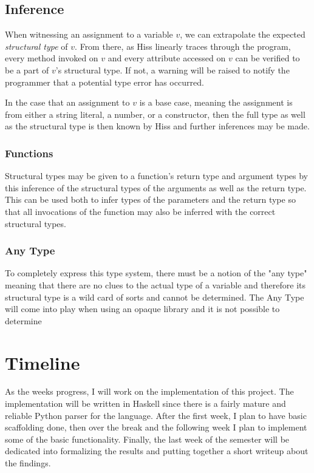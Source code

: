 \documentclass{scrartcl}
\begin{document}
\begin{multicols}{2}
\subsection*{Inference}

When witnessing an assignment to a variable $v$, we can extrapolate the
expected \emph{structural type} of $v$. From there, as Hiss linearly traces
through the program, every method invoked on $v$ and every attribute accessed
on $v$ can be verified to be a part of $v$'s structural type. If not, a warning
will be raised to notify the programmer that a potential type error has
occurred.

In the case that an assignment to $v$ is a base case, meaning the assignment
is from either a string literal, a number, or a constructor, then the full
type as well as the structural type is then known by Hiss and further inferences
may be made.

\subsubsection*{Functions}

Structural types may be given to a function's return type and argument types by
this inference of the structural types of the arguments as well as the return
type. This can be used both to infer types of the parameters and the return type
so that all invocations of the function may also be inferred with the correct
structural types.

\subsubsection*{Any Type}

To completely express this type system, there must be a notion of the "any type"
meaning that there are no clues to the actual type of a variable and therefore
its structural type is a wild card of sorts and cannot be determined. The Any Type
will come into play when using an opaque library and it is not possible to determine

\section*{Timeline}

As the weeks progress, I will work on the implementation of this project. The
implementation will be written in Haskell since there is a fairly mature and reliable
Python parser for the language. After the first week, I plan to have basic scaffolding
done, then over the break and the following week I plan to implement some of the
basic functionality. Finally, the last week of the semester will be dedicated into
formalizing the results and putting together a short writeup about the findings.




\vspace{\textheight}
\end{multicols}
\end{document}
